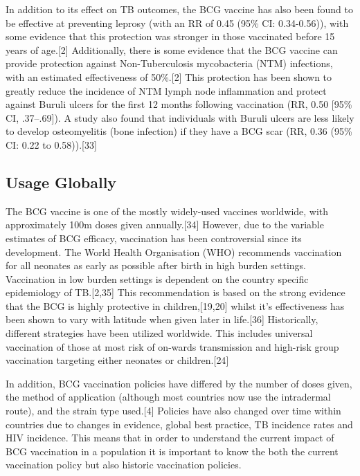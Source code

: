 \documentclass[11pt,twoside]{bristolthesis}
\begin{document}
  In addition to its effect on TB outcomes, the BCG vaccine has also been found to be effective at preventing leprosy (with an RR of 0.45 (95\% CI: 0.34-0.56)), with some evidence that this protection was stronger in those vaccinated before 15 years of age.{[}2{]} Additionally, there is some evidence that the BCG vaccine can provide protection against Non-Tuberculosis mycobacteria (NTM) infections, with an estimated effectiveness of 50\%.{[}2{]} This protection has been shown to greatly reduce the incidence of NTM lymph node inflammation and protect against Buruli ulcers for the first 12 months following vaccination (RR, 0.50 {[}95\% CI, .37--.69{]}). A study also found that individuals with Buruli ulcers are less likely to develop osteomyelitis (bone infection) if they have a BCG scar (RR, 0.36 (95\% CI: 0.22 to 0.58)).{[}33{]}
  
  \hypertarget{usage-globally}{%
  \subsection{Usage Globally}\label{usage-globally}}
  
  The BCG vaccine is one of the mostly widely-used vaccines worldwide, with approximately 100m doses given annually.{[}34{]} However, due to the variable estimates of BCG efficacy, vaccination has been controversial since its development. The World Health Organisation (WHO) recommends vaccination for all neonates as early as possible after birth in high burden settings. Vaccination in low burden settings is dependent on the country specific epidemiology of TB.{[}2,35{]} This recommendation is based on the strong evidence that the BCG is highly protective in children,{[}19,20{]} whilst it's effectiveness has been shown to vary with latitude when given later in life.{[}36{]} Historically, different strategies have been utilized worldwide. This includes universal vaccination of those at most risk of on-wards transmission and high-risk group vaccination targeting either neonates or children.{[}24{]}
  
  In addition, BCG vaccination policies have differed by the number of doses given, the method of application (although most countries now use the intradermal route), and the strain type used.{[}4{]} Policies have also changed over time within countries due to changes in evidence, global best practice, TB incidence rates and HIV incidence. This means that in order to understand the current impact of BCG vaccination in a population it is important to know the both the current vaccination policy but also historic vaccination policies.
  
\end{document}
